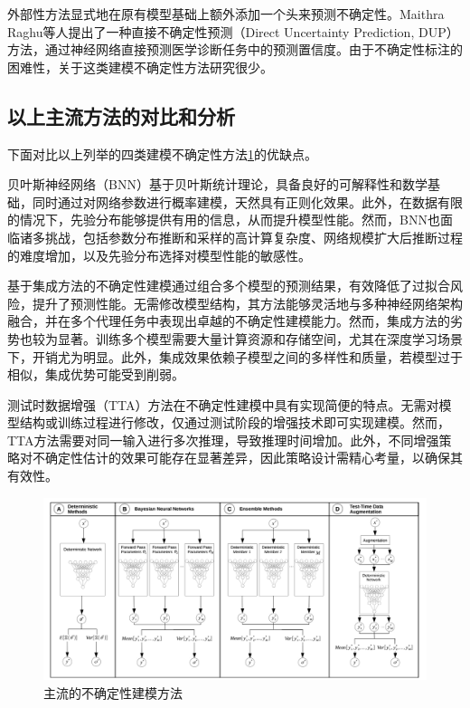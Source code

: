 外部性方法显式地在原有模型基础上额外添加一个头来预测不确定性。Maithra Raghu等人\cite{raghu2019direct}提出了一种直接不确定性预测（Direct Uncertainty Prediction, DUP）方法，通过神经网络直接预测医学诊断任务中的预测置信度。由于不确定性标注的困难性，关于这类建模不确定性方法研究很少。




\subsection{以上主流方法的对比和分析}
下面对比以上列举的四类建模不确定性方法\ref{fig:uq}的优缺点。

贝叶斯神经网络（BNN）基于贝叶斯统计理论，具备良好的可解释性和数学基础，同时通过对网络参数进行概率建模，天然具有正则化效果。此外，在数据有限的情况下，先验分布能够提供有用的信息，从而提升模型性能。然而，BNN也面临诸多挑战，包括参数分布推断和采样的高计算复杂度、网络规模扩大后推断过程的难度增加，以及先验分布选择对模型性能的敏感性。

基于集成方法的不确定性建模通过组合多个模型的预测结果，有效降低了过拟合风险，提升了预测性能。无需修改模型结构，其方法能够灵活地与多种神经网络架构融合，并在多个代理任务中表现出卓越的不确定性建模能力。然而，集成方法的劣势也较为显著。训练多个模型需要大量计算资源和存储空间，尤其在深度学习场景下，开销尤为明显。此外，集成效果依赖子模型之间的多样性和质量，若模型过于相似，集成优势可能受到削弱。  

测试时数据增强（TTA）方法在不确定性建模中具有实现简便的特点。无需对模型结构或训练过程进行修改，仅通过测试阶段的增强技术即可实现建模。然而，TTA方法需要对同一输入进行多次推理，导致推理时间增加。此外，不同增强策略对不确定性估计的效果可能存在显著差异，因此策略设计需精心考量，以确保其有效性。  

\begin{figure}[H]
    \centering
    \includegraphics[width=0.9\linewidth]{assets/uq.png}
    \caption{主流的不确定性建模方法\cite{gawlikowski2023survey}
}
    \label{fig:uq}
\end{figure}

